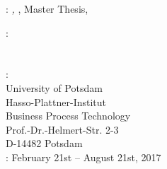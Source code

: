 \thispagestyle{empty}

\hfill

\vfill

\noindent\myName: \textit{\myTitle,} \mySubtitle, Master Thesis, %
\textcopyright\ \myTime

\bigskip
%
\noindent{}: \\
\myProf \\
\mySupervisor \\
%
\medskip
%
\noindent {}: \\
University of Potsdam\\
Hasso-Plattner-Institut\\
Business Process Technology\\
Prof.-Dr.-Helmert-Str. 2-3\\
D-14482 Potsdam\\
%
\medskip
%
\noindent{}: February 21st -- August 21st, 2017 \\
